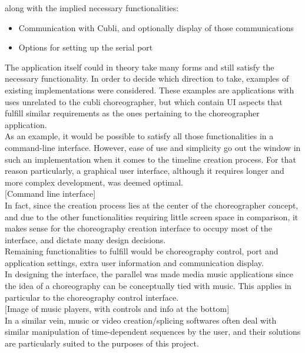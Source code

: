 along with the implied necessary functionalities:

\begin{itemize}
\item Communication with Cubli, and optionally display of those communications
\item Options for setting up the serial port
\end{itemize}


The application itself could in theory take many forms and still satisfy the necessary functionality. In order to decide which direction to take, examples of existing implementations were considered. These examples are applications with uses unrelated to the cubli choreographer, but which contain UI aspects that fulfill similar requirements as the ones pertaining to the choreographer application.\\

As an example, it would be possible to satisfy all those functionalities in a command-line interface. However, ease of use and simplicity go out the window in such an implementation when it comes to the timeline creation process. For that reason particularly, a graphical user interface, although it requires longer and more complex development, was deemed optimal.\\

[Command line interface]\\

In fact, since the creation process lies at the center of the choreographer concept, and due to the other functionalities requiring little screen space in comparison, it makes sense for the choreography creation interface to occupy most of the interface, and dictate many design decisions.\\

Remaining functionalities to fulfill would be choreography control, port and application settings, extra user information and communication display.\\

In designing the interface, the parallel was made media music applications since the idea of a choreography can be conceptually tied with music. This applies in particular to the choreography control interface.\\

[Image of music players, with controls and info at the bottom]\\

In a similar vein, music or video creation/splicing softwares often deal with similar manipulation of time-dependent sequences by the user, and their solutions are particularly suited to the purposes of this project.\\

